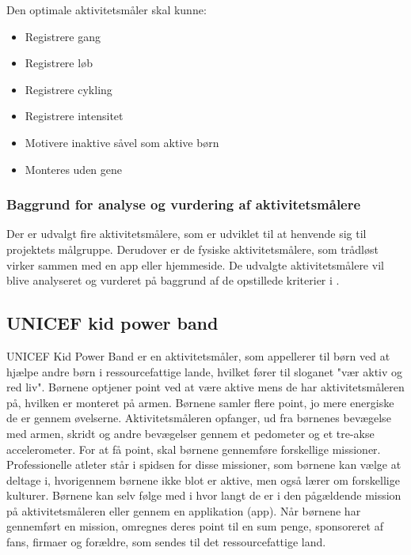 Den optimale aktivitetsmåler skal kunne: 
\begin{itemize}
\item Registrere gang
\item Registrere løb
\item Registrere cykling
\item Registrere intensitet %
\item Motivere inaktive såvel som aktive børn %
\item Monteres uden gene
\end{itemize}

\subsubsection{Baggrund for analyse og vurdering af aktivitetsmålere}
Der er udvalgt fire aktivitetsmålere, som er udviklet til at henvende sig til projektets målgruppe. Derudover er de fysiske aktivitetsmålere, som trådløst virker sammen med en app eller hjemmeside. 
De udvalgte aktivitetsmålere vil blive analyseret og vurderet på baggrund af de opstillede kriterier i .


\subsection{UNICEF kid power band}
UNICEF Kid Power Band er en aktivitetsmåler, som appellerer til børn ved at hjælpe andre børn i ressourcefattige lande, hvilket fører til sloganet "vær aktiv og red liv". Børnene optjener point ved at være aktive mens de har aktivitetsmåleren på, hvilken er monteret på armen. Børnene samler flere point, jo mere energiske de er gennem øvelserne. Aktivitetsmåleren opfanger, ud fra børnenes bevægelse med armen, skridt og andre bevægelser gennem et pedometer og et tre-akse accelerometer. \citep{PowerAbout2015,PowerManual2015} \newline 
For at få point, skal børnene gennemføre forskellige missioner. Professionelle atleter står i spidsen for disse missioner, som børnene kan vælge at deltage i, hvorigennem børnene ikke blot er aktive, men også lærer om forskellige kulturer. %
\citep{PowerMission2015} 
Børnene kan selv følge med i hvor langt de er i den pågældende mission på aktivitetsmåleren eller gennem en applikation (app). Når børnene har gennemført en mission, omregnes deres point til en sum penge, sponsoreret af fans, firmaer og forældre, som sendes til det ressourcefattige land. \newline

